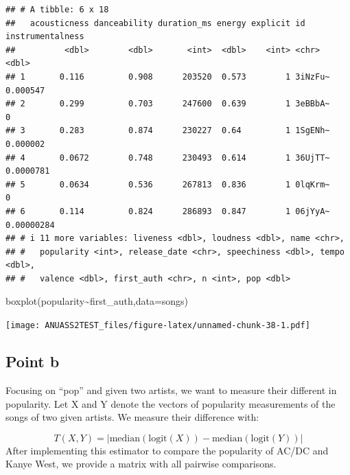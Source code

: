 \documentclass[
]{article}
\newenvironment{Shaded}{\begin{snugshade}}{\end{snugshade}}
\newcommand{\AttributeTok}[1]{\textcolor[rgb]{0.77,0.63,0.00}{#1}}
\newcommand{\FunctionTok}[1]{\textcolor[rgb]{0.00,0.00,0.00}{#1}}
\newcommand{\NormalTok}[1]{#1}
\newcommand{\SpecialCharTok}[1]{\textcolor[rgb]{0.00,0.00,0.00}{#1}}
\begin{document}
\begin{verbatim}
## # A tibble: 6 x 18
##   acousticness danceability duration_ms energy explicit id      instrumentalness
##          <dbl>        <dbl>       <int>  <dbl>    <int> <chr>              <dbl>
## 1       0.116         0.908      203520  0.573        1 3iNzFu~       0.000547  
## 2       0.299         0.703      247600  0.639        1 3eBBbA~       0         
## 3       0.283         0.874      230227  0.64         1 1SgENh~       0.000002  
## 4       0.0672        0.748      230493  0.614        1 36UjTT~       0.0000781 
## 5       0.0634        0.536      267813  0.836        1 0lqKrm~       0         
## 6       0.114         0.824      286893  0.847        1 06jYyA~       0.00000284
## # i 11 more variables: liveness <dbl>, loudness <dbl>, name <chr>,
## #   popularity <int>, release_date <chr>, speechiness <dbl>, tempo <dbl>,
## #   valence <dbl>, first_auth <chr>, n <int>, pop <dbl>
\end{verbatim}

\begin{Shaded}
\begin{Highlighting}[]
\FunctionTok{boxplot}\NormalTok{(popularity}\SpecialCharTok{\textasciitilde{}}\NormalTok{first\_auth,}\AttributeTok{data=}\NormalTok{songs)}
\end{Highlighting}
\end{Shaded}

\texttt{[image: ANUASS2TEST\_files/figure-latex/unnamed-chunk-38-1.pdf]}

\hypertarget{point-b-1}{%
\subsection{Point b}\label{point-b-1}}

Focusing on ``pop'' and given two artists, we want to measure their
different in popularity. Let X and Y denote the vectors of popularity
measurements of the songs of two given artists. We measure their
difference with:

\[
T(X, Y) = \left| \text{median}(\text{logit}(X)) - \text{median}(\text{logit}(Y)) \right|
\] After implementing this estimator to compare the popularity of AC/DC
and Kanye West, we provide a matrix with all pairwise comparisons.
\end{document}
